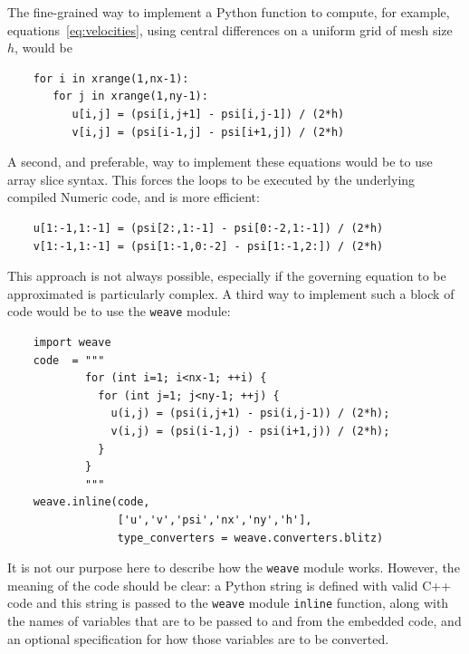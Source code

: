 \documentclass[acmtocl]{acmtrans2m}
\begin{document}
The fine-grained way to implement a Python function to compute, for
example, equations~\ref{eq:velocities}, using central differences on a
uniform grid of mesh size $h$, would be
\begin{verbatim}
    for i in xrange(1,nx-1):
       for j in xrange(1,ny-1):
          u[i,j] = (psi[i,j+1] - psi[i,j-1]) / (2*h)
          v[i,j] = (psi[i-1,j] - psi[i+1,j]) / (2*h)
\end{verbatim}
A second, and preferable, way to implement these equations would be to
use array slice syntax.  This forces the loops to be executed by the
underlying compiled Numeric code, and is more efficient:
\begin{verbatim}
    u[1:-1,1:-1] = (psi[2:,1:-1] - psi[0:-2,1:-1]) / (2*h)
    v[1:-1,1:-1] = (psi[1:-1,0:-2] - psi[1:-1,2:]) / (2*h)
\end{verbatim}
This approach is not always possible, especially if the governing
equation to be approximated is particularly complex.  A third way to
implement such a block of code would be to use the {\tt weave} module:
\begin{verbatim}
    import weave
    code  = """
            for (int i=1; i<nx-1; ++i) {
              for (int j=1; j<ny-1; ++j) {
                u(i,j) = (psi(i,j+1) - psi(i,j-1)) / (2*h);
                v(i,j) = (psi(i-1,j) - psi(i+1,j)) / (2*h);
              }
            }
            """
    weave.inline(code,
                 ['u','v','psi','nx','ny','h'],
                 type_converters = weave.converters.blitz)
\end{verbatim}
It is not our purpose here to describe how the {\tt weave} module
works.  However, the meaning of the code should be clear: a Python
string is defined with valid C++ code and this string is passed to the
{\tt weave} module {\tt inline} function, along with the names of
variables that are to be passed to and from the embedded code, and an
optional specification for how those variables are to be converted.
\end{document}
